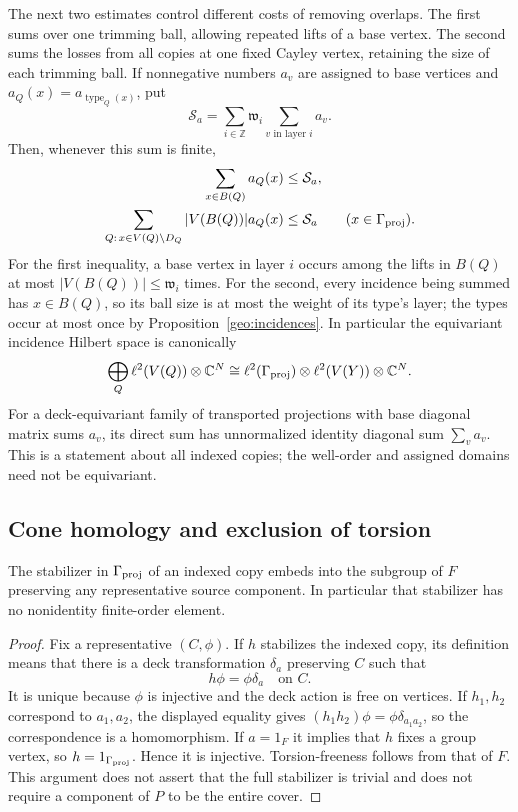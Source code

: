The next two estimates control different costs of removing overlaps.  The
first sums over one trimming ball, allowing repeated lifts of a base
vertex.  The second sums the losses from all copies at one fixed Cayley
vertex, retaining the size of each trimming ball.  If nonnegative numbers
$a_v$ are assigned to base vertices and
$a_Q(x)=a_{\operatorname{type}_Q(x)}$, put
\[
 \mathcal S_a=\sum_{i\in\mathbb Z}\mathfrak w_i
                   \sum_{v\text{ in layer }i}a_v.
\]
Then, whenever this sum is finite,
\begin{align}
 \sum_{x\in B(Q)}a_Q(x)&\le\mathcal S_a,
 \label{geo:ball-weighted-sum}\\
 \sum_{Q:\,x\in V(Q)\setminus D_Q}|V(B(Q))|a_Q(x)
          &\le\mathcal S_a\qquad(x\in\Gamma_{\mathrm{proj}}).
 \label{geo:lost-weighted-sum}
\end{align}
For the first inequality, a base vertex in layer $i$ occurs among the
lifts in $B(Q)$ at most $|V(B(Q))|\le\mathfrak w_i$ times.  For the
second, every incidence being summed has $x\in B(Q)$, so its ball size
is at most the weight of its type's layer; the types occur at most once
by Proposition~\ref{geo:incidences}.  In particular the equivariant
incidence Hilbert space is canonically
\[
 \bigoplus_Q\ell^2(V(Q))\otimes\mathbb C^N
 \cong \ell^2(\Gamma_{\mathrm{proj}})\otimes\ell^2(V(Y))\otimes\mathbb C^N.
\]
For a deck-equivariant family of transported projections with base
diagonal matrix sums $a_v$, its direct sum has unnormalized identity
diagonal sum $\sum_v a_v$.  This is a statement about all indexed copies;
the well-order and assigned domains need not be equivariant.

\subsection{Cone homology and exclusion of torsion}
\label{geo:torsion-subsection}

\begin{lemma}
\label{geo:stabilizers}
The stabilizer in $\Gamma_{\mathrm{proj}}$ of an indexed copy embeds into the subgroup
of $F$ preserving any representative source component.  In particular
that stabilizer has no nonidentity finite-order element.
\end{lemma}

\begin{proof}
Fix a representative $(C,\phi)$.  If $h$ stabilizes the indexed copy, its
definition means that there is a deck transformation $\delta_a$ preserving
$C$ such that
\[
 h\phi=\phi\delta_a\quad\text{on }C.
\]
It is unique because $\phi$ is injective and the deck action is free on
vertices.  If $h_1,h_2$ correspond to $a_1,a_2$, the displayed equality
gives $(h_1h_2)\phi=\phi\delta_{a_1a_2}$, so the correspondence is a
homomorphism.  If $a=1_F$ it implies that $h$ fixes a group vertex, so
$h=1_{\Gamma_{\mathrm{proj}}}$.  Hence it is injective.  Torsion-freeness follows from
that of $F$.  This argument does not assert that the full stabilizer is
trivial and does not require a component of $P$ to be the entire cover.
\end{proof}

